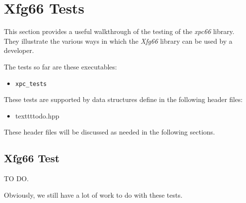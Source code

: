 %
%
%

\section{Xfg66 Tests}
\label{sec:xpc66_tests}

   This section provides a useful walkthrough of the testing
   of the \textsl{xpc66} library.
   They illustrate the various ways in which the \textsl{Xfg66} library
   can be used by a developer.

   The tests so far are these executables:

    \begin{itemize}
        \item \texttt{xpc\_tests}
    \end{itemize}

    These tests are supported by data structures define in the following
    header files:

    \begin{itemize}
        \item texttt{todo.hpp}
    \end{itemize}

    These header files will be discussed as needed in the following sections.

\subsection{Xfg66 Test}
\label{subsec:xpc66_tests_test}

   TO DO.

   Obviously, we still have a lot of work to do with these tests.

